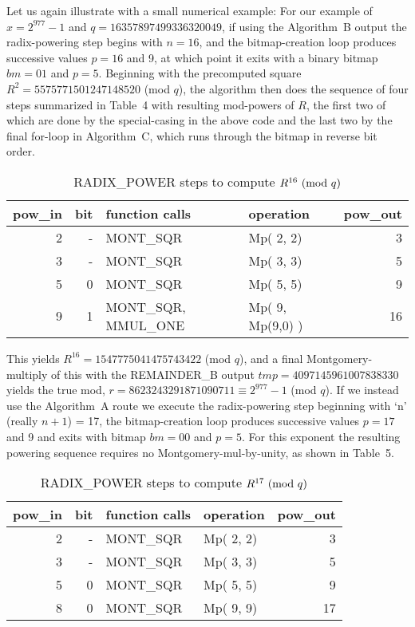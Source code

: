 \documentclass{article}
\begin{document}
Let us again illustrate with a small numerical example: For our example of $x = 2^{977}-1$ and $q = 16357897499336320049$, if using the Algorithm~B output the radix-powering step begins with $n = 16$, and the bitmap-creation loop produces successive values $p = 16$ and 9, at which point it exits with a binary bitmap $bm = 01$ and $p = 5$. Beginning with the precomputed square $R^2 = 5575771501247148520$ (mod $q$), the algorithm then does the sequence of four steps summarized in Table~4 with resulting mod-powers of $R$, the first two of which are done by the special-casing in the above code and the last two by the final for-loop in Algorithm~C, which runs through the bitmap in reverse bit order.
\begin{table}[ht]
\begin{center}
\label{r16}
\caption{RADIX\_POWER steps to compute $R^{16}\ ({\rm mod}\ q)$}
\begin{tabular}{r|r|l|l|r}
	pow\_in	&bit	&function calls			&operation			&pow\_out	\\
\hline
	 2		&  -	&MONT\_SQR				&Mp( 2, 2)			& 3			\\
	 3		&  -	&MONT\_SQR				&Mp( 3, 3)			& 5			\\
	 5		&  0	&MONT\_SQR				&Mp( 5, 5)			& 9			\\
	 9		&  1	&MONT\_SQR, MMUL\_ONE	&Mp( 9, Mp(9,0) )	&16
\end{tabular}
\end{center}
\end{table}

\vspace{-0.2in}
This yields $R^{16} = 1547775041475743422$ (mod $q$), and a final Montgomery-multiply of this with the REMAINDER\_B output $tmp = 4097145961007838330$ yields the true mod, $r = 8623243291871090711 \equiv 2^{977}-1$ (mod $q$).  If we instead use the Algorithm~A route we execute the radix-powering step beginning with `n' (really $n+1$) = 17, the bitmap-creation loop produces successive values $p = 17$ and 9 and exits with bitmap $bm = 00$ and $p = 5$. For this exponent the resulting powering sequence requires no Montgomery-mul-by-unity, as shown in Table~5.
\begin{table}[ht]
\begin{center}
\label{r17}
\caption{RADIX\_POWER steps to compute $R^{17}\ ({\rm mod}\ q)$}
\begin{tabular}{r|r|l|l|r}
	pow\_in	&bit	&function calls			&operation			&pow\_out	\\
\hline
	 2		&  -	&MONT\_SQR				&Mp( 2, 2)			& 3			\\
	 3		&  -	&MONT\_SQR				&Mp( 3, 3)			& 5			\\
	 5		&  0	&MONT\_SQR				&Mp( 5, 5)			& 9			\\
	 8		&  0	&MONT\_SQR				&Mp( 9, 9)			&17
\end{tabular}
\end{center}
\end{table}
\end{document}
